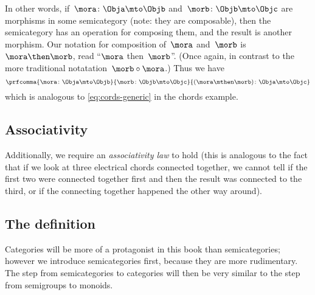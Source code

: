 In other words, if~$\mora\colon \Obja \mto \Objb$ and~$\morb\colon \Objb \mto \Objc$ are morphisms in some semicategory (note: they are composable), then the semicategory has an operation for composing them, and the result is another morphism.
Our notation for composition of~$\mora$ and~$\morb$ is~$\mora \then \morb$, read ``$\mora$ then~$\morb$''.
(Once again, in contrast to the more traditional notatation~$\morb \circ \mora$.) Thus we have
\begin{equation}
	\prfcomma{
		\mora \colon \Obja \mto \Objb
	}{
		\morb\colon \Objb \mto \Objc
	}{
		(\mora \mthen \morb )\colon \Obja \mto \Objc
	}
\end{equation}
which is analogous to \cref{eq:cords-generic}  in the chords example.

\subsection{Associativity}


Additionally, we require an \emph{associativity law} to hold (this is analogous to the fact that if we look at three electrical chords connected together, we cannot tell if the first two were connected together first and then the result was connected to the third, or if the connecting together happened the other way around).

\subsection{The definition}

Categories will be more of a protagonist in this book than semicategories; however we introduce semicategories first, because they are more rudimentary.
The step from semicategories to categories will then be very similar to the step from semigroups to monoids.

